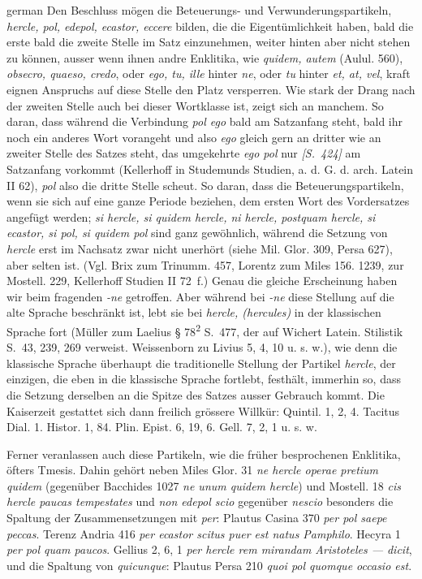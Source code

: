\begin{otherlanguage*}{german}
Den Beschluss mögen die Beteuerungs- und Verwunderungspartikeln, \emph{hercle, pol, edepol, ecastor, eccere} bilden, die die Eigentümlichkeit haben, bald die erste bald die zweite Stelle im Satz einzunehmen, weiter hinten aber nicht stehen zu können, ausser wenn ihnen andre Enklitika, wie \emph{quidem, autem} (Aulul. 560), \emph{obsecro, quaeso, credo}, oder \emph{ego, tu, ille} hinter \emph{ne}, oder \emph{tu} hinter \emph{et, at, vel}, kraft eignen Anspruchs auf diese Stelle den Platz versperren. Wie stark der Drang nach der zweiten Stelle auch bei dieser Wortklasse ist, zeigt sich an manchem. So daran, dass während die Verbindung \emph{pol ego} bald am Satzanfang steht, bald ihr noch ein anderes Wort vorangeht und also \emph{ego} gleich gern an dritter wie an zweiter Stelle des Satzes steht, das umgekehrte \emph{ego pol} nur \hypertarget{p424}{\emph{[S.~424]}}\label{p424} am Satzanfang vorkommt (Kellerhoff in Studemunds Studien, a. d. G. d. arch. Latein II 62), \emph{pol} also die dritte Stelle scheut. So daran, dass die Beteuerungspartikeln, wenn sie sich auf eine ganze Periode beziehen, dem ersten Wort des Vordersatzes angefügt werden; \emph{si hercle, si quidem hercle, ni hercle, postquam hercle, si ecastor, si pol, si quidem pol} sind ganz gewöhnlich, während die Setzung von \emph{hercle} erst im Nachsatz zwar nicht unerhört (siehe Mil. Glor. 309, Persa 627), aber selten ist. (Vgl. Brix zum Trinumm. 457, Lorentz zum Miles 156. 1239, zur Mostell. 229, Kellerhoff Studien II 72~f.) Genau die gleiche Erscheinung haben wir beim fragenden \emph{-ne} getroffen. Aber während bei \emph{-ne} diese Stellung auf die alte Sprache beschränkt ist, lebt sie bei \emph{hercle, (hercules)} in der klassischen Sprache fort (Müller zum Laelius § 78\textsuperscript{2} S.~477, der auf Wichert Latein. Stilistik S.~43, 239, 269 verweist. Weissenborn zu Livius 5, 4, 10 u. s. w.), wie denn die klassische Sprache überhaupt die traditionelle Stellung der Partikel \emph{hercle}, der einzigen, die eben in die klassische Sprache fortlebt, festhält, immerhin so, dass die Setzung derselben an die Spitze des Satzes ausser Gebrauch kommt. Die Kaiserzeit gestattet sich dann freilich grössere Willkür: Quintil. 1, 2, 4. Tacitus Dial. 1. Histor. 1, 84. Plin. Epist. 6, 19, 6. Gell. 7, 2, 1 u. s. w.

Ferner veranlassen auch diese Partikeln, wie die früher besprochenen Enklitika, öfters Tmesis. Dahin gehört neben Miles Glor. 31 \emph{ne hercle operae pretium quidem} (gegenüber Bacchides 1027 \emph{ne unum quidem hercle}) und Mostell. 18 \emph{cis hercle paucas tempestates} und \emph{non edepol scio} gegenüber \emph{nescio} besonders die Spaltung der Zusammensetzungen mit \emph{per}: Plautus Casina 370 \emph{per pol saepe peccas}. Terenz Andria 416 \emph{per ecastor scitus puer est natus Pamphilo}. Hecyra 1 \emph{per pol quam paucos}. Gellius 2, 6, 1 \emph{per hercle rem mirandam Aristoteles — dicit}, und die Spaltung von \emph{quicunque}: Plautus Persa 210 \emph{quoi pol quomque occasio est}.


\end{otherlanguage*}
